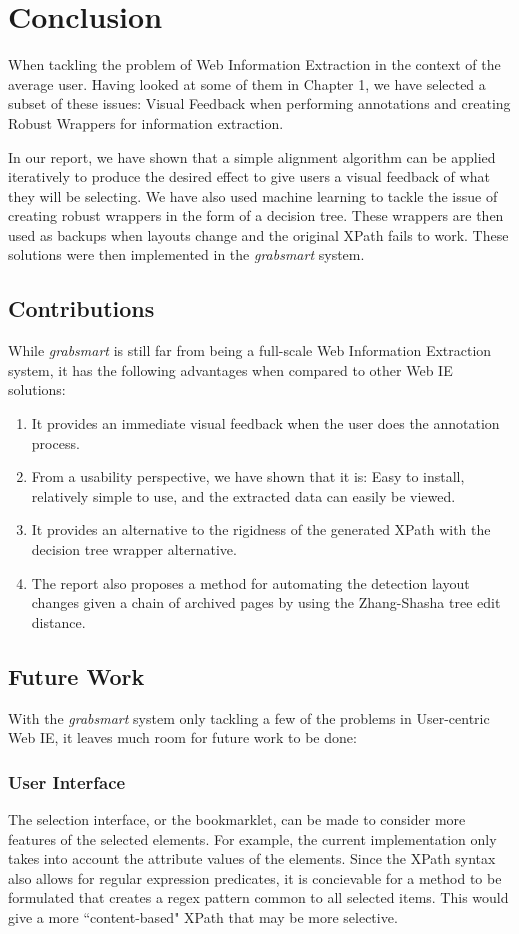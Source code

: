 \chapter{Conclusion}
When tackling the problem of Web Information Extraction in the context of the average user.
Having looked at some of them in Chapter 1, we have selected a subset of these issues:
Visual Feedback when performing annotations and creating Robust Wrappers for information 
extraction.

In our report, we have shown that a simple alignment algorithm can be applied iteratively to
produce the desired effect to give users a visual feedback of what they will be selecting.
We have also used machine learning to tackle the issue of creating robust wrappers in the form
of a decision tree. These wrappers are then used as backups when layouts change and the original
XPath fails to work. These solutions were then implemented in the \textit{grabsmart} system.

\section{Contributions}
While \textit{grabsmart} is still far from being a full-scale Web Information Extraction system,
it has the following advantages when compared to other Web IE solutions:
\begin{enumerate}
	\item It provides an immediate visual feedback when the user does the annotation process.
	\item From a usability perspective, we have shown that it is: Easy to install, relatively
	simple to use, and the extracted data can easily be viewed.
	\item It provides an alternative to the rigidness of the generated XPath with the decision
	tree wrapper alternative.
	\item The report also proposes a method for automating the detection layout changes given
	a chain of archived pages by using the Zhang-Shasha tree edit distance.
\end{enumerate}

\section{Future Work}
With the \textit{grabsmart} system only tackling a few of the problems in User-centric Web IE,
it leaves much room for future work to be done:

\subsection{User Interface}
The selection interface, or the bookmarklet, can be made to consider more
features of the selected elements. For example, the current implementation only takes into 
account the attribute values of the elements. Since the XPath syntax also allows for 
regular expression predicates, it is concievable for a method to be formulated that creates
a regex pattern common to all selected items. This would give a more ``content-based" XPath
that may be more selective.

